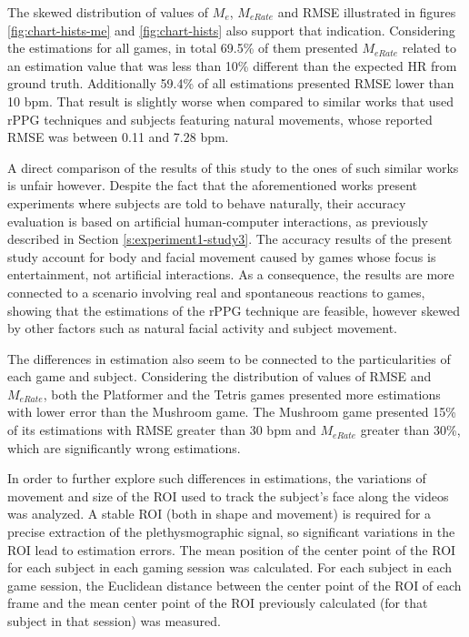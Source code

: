 The skewed distribution of values of $M_e$, $M_{eRate}$ and RMSE illustrated in figures \ref{fig:chart-hists-me} and \ref{fig:chart-hists} also support that indication. Considering the estimations for all games, in total 69.5\% of them presented $M_{eRate}$ related to an estimation value that was less than 10\% different than the expected HR from ground truth. Additionally 59.4\% of all estimations presented RMSE lower than 10 bpm. That result is slightly worse when compared to similar works that used rPPG techniques and subjects featuring natural movements, whose reported RMSE was between 0.11 and 7.28 bpm.

A direct comparison of the results of this study to the ones of such similar works is unfair however. Despite the fact that the aforementioned works present experiments where subjects are told to behave naturally, their accuracy evaluation is based on artificial human-computer interactions, as previously described in Section \ref{s:experiment1-study3}. The accuracy results of the present study account for body and facial movement caused by games whose focus is entertainment, not artificial interactions. As a consequence, the results are more connected to a scenario involving real and spontaneous reactions to games, showing that the estimations of the rPPG technique are feasible, however skewed by other factors such as natural facial activity and subject movement.

The differences in estimation also seem to be connected to the particularities of each game and subject. Considering the distribution of values of RMSE and $M_{eRate}$, both the Platformer and the Tetris games presented more estimations with lower error than the Mushroom game. The Mushroom game presented 15\% of its estimations with RMSE greater than 30 bpm and $M_{eRate}$ greater than 30\%, which are significantly wrong estimations.

In order to further explore such differences in estimations, the variations of movement and size of the ROI used to track the subject's face along the videos was analyzed. A stable ROI (both in shape and movement) is required for a precise extraction of the plethysmographic signal, so significant variations in the ROI lead to estimation errors. The mean position of the center point of the ROI for each subject in each gaming session was calculated. For each subject in each game session, the Euclidean distance between the center point of the ROI of each frame and the mean center point of the ROI previously calculated (for that subject in that session) was measured.


